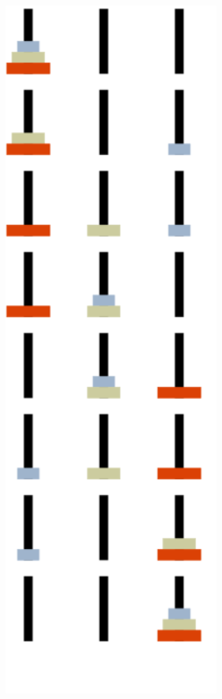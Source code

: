 \documentclass{article}%
\begin{document}
\includegraphics[width=0.6\textwidth]{examples/output/hanoi.png}
\end{document}
